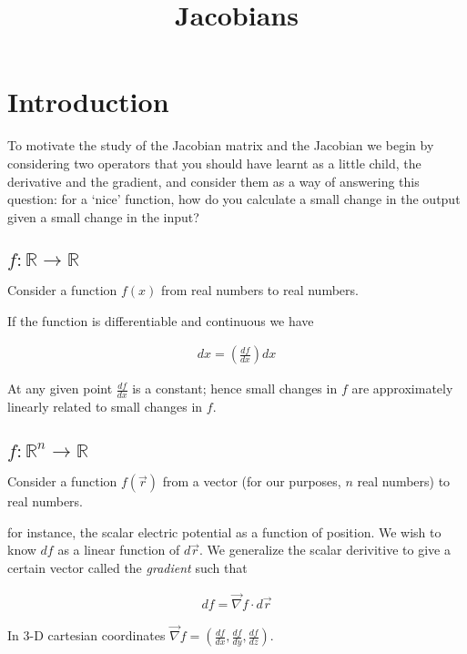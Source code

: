 \documentclass{article}
\title{Jacobians}
\date{}
\begin{document}
\maketitle

\section{Introduction}

To motivate the study of the Jacobian matrix and the Jacobian we begin by considering two operators that you should have learnt as a little child, the derivative and the gradient, and consider them as a way of answering this question: for a `nice' function, how do you calculate a small change in the output given a small change in the input?

\subsection{$f: \mathbb{R} \rightarrow \mathbb{R}$}

Consider a function $f(x)$ from real numbers to real numbers.

If the function is differentiable and continuous we have 

\begin{align}
dx = (\frac{df}{dx}) dx
\end{align}

At any given point $\frac{df}{dx}$ is a constant; hence small changes in $f$ are approximately linearly related to small changes in $f$.

\subsection{$f: \mathbb{R}^n \rightarrow \mathbb{R}$}

Consider a function $f(\vec{r})$ from a vector (for our purposes, $n$ real numbers) to real numbers.

for instance, the scalar electric potential as a function of position. We wish to know $df$ as a linear function of $d\vec{r}$. We generalize the scalar derivitive to give a certain vector called the \emph{gradient} such that 

\begin{align}
df = \vec\nabla f \cdot d\vec{r}
\end{align}

In 3-D cartesian coordinates $\vec\nabla f = (\frac{df}{dx}, \frac{df}{dy}, \frac{df}{dz})$.
\end{document}
